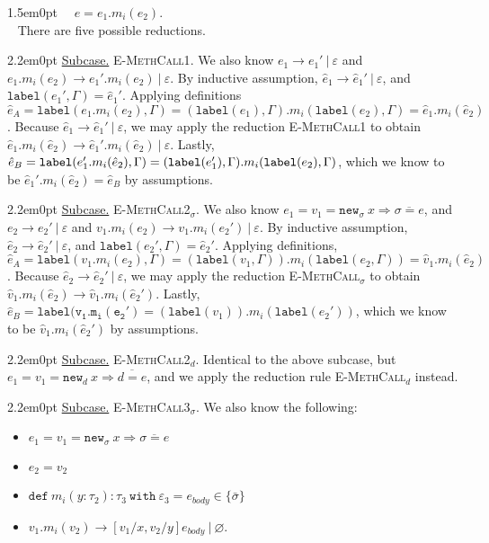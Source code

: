 \documentclass{llncs}
\newcommand{\keywadj}[1]{\mathtt{#1}}
\newcommand{\keyw}[1]{\keywadj{#1}~}
\newcommand{\proofcase}[2]{
	\begin{adjustwidth}{1.5em}{0pt}
		\fbox{Case.}~~#1. \\ ~#2
	\end{adjustwidth}
}
\newcommand{\subcase}[1] {
	\begin{adjustwidth}{2.2em}{0pt}
		\underline{Subcase.} #1
	\end{adjustwidth}
}
\newcommand{\type}[2]{
	#1~\keyw{with} #2
}
\newcommand{\newd}[0]{
	\keywadj{new}_d~x \Rightarrow \overline{d = e}
}
\newcommand{\newsig}[0]{
	\keywadj{new}_\sigma~x \Rightarrow \overline{\sigma = e}
}
\begin{document}
{{{}
}
	
\proofcase{$e=e_1.m_i(e_2)$}{
\noindent
There are five possible reductions. \\

\subcase{ \textsc{E-MethCall1}. We also know $e_1 \longrightarrow e_1'~|~\varepsilon$ and $e_1.m_i(e_2) \longrightarrow e_1'.m_i(e_2)~|~\varepsilon$. By inductive assumption, $\hat e_1 \longrightarrow \hat e_1'~|~\varepsilon$, and $\keywadj{label}(e_1', \Gamma) = \hat e_1'$. Applying definitions $\hat e_A = \keywadj{label}(e_1.m_i(e_2), \Gamma) = (\keywadj{label}(e_1), \Gamma).m_i(\keywadj{label}(e_2), \Gamma) = \hat e_1.m_i(\hat e_2)$. Because $\hat e_1 \longrightarrow \hat e_1'~|~\varepsilon$, we may apply the reduction \textsc{E-MethCall1} to obtain $\hat e_1.m_i(\hat e_2) \longrightarrow \hat e_1'.m_i(\hat e_2)~|~\varepsilon$. Lastly, $\hat e_B = \keywadj{label}(e_1'.m_i(\hat e_2), \Gamma) = \\ (\keywadj{label}(e_1'), \Gamma).m_i(\keywadj{label}(e_2), \Gamma)$, which we know to be $\hat e_1'.m_i(\hat e_2) = \hat e_B$ by assumptions.\\

}

\subcase{ \textsc{E-MethCall2$_\sigma$}. We also know $e_1 = v_1 = \newsig$, and $e_2 \longrightarrow e_2'~|~\varepsilon$ and $v_1.m_i(e_2) \longrightarrow v_1.m_i(e_2')~|~\varepsilon$. By inductive assumption, $\hat e_2 \longrightarrow \hat e_2'~|~\varepsilon$, and $\keywadj{label}(e_2', \Gamma) = \hat e_2'$. Applying definitions, $\hat e_A = \keywadj{label}(v_1.m_i(e_2), \Gamma) = (\keywadj{label}(v_1, \Gamma)).m_i(\keywadj{label}(e_2, \Gamma)) = \hat v_1.m_i(\hat e_2)$. Because $\hat e_2 \longrightarrow \hat e_2'~|~\varepsilon$, we may apply the reduction \textsc{E-MethCall$_\sigma$} to obtain $\hat v_1.m_i(\hat e_2) \longrightarrow \hat v_1.m_i(\hat e_2')$. Lastly, $\hat e_B = \keywadj{label(v_1.m_i(e_2')} = (\keywadj{label}(v_1)).m_i(\keywadj{label}(e_2'))$, which we know to be $\hat v_1.m_i(\hat e_2')$ by assumptions. \\
}

\subcase{ \textsc{E-MethCall2$_d$}. Identical to the above subcase, but $e_1 = v_1 = \newd$, and we apply the reduction rule \textsc{E-MethCall$_d$} instead. 
\\}


\subcase{ \textsc{E-MethCall3$_\sigma$}. We also know the following:
\begin{itemize}
	\item $e_1 = v_1 = \newsig$
	\item $e_2 = v_2$
	\item $\keywadj{def~} m_i(y : \tau_2) : \type{\tau_3}{\varepsilon_3} = e_{body} \in \{ \bar \sigma \}$
	\item $v_1.m_i(v_2) \longrightarrow [v_1/x, v_2/y]e_{body}~|~\varnothing$.
\end{itemize}

}}}
\end{document}
